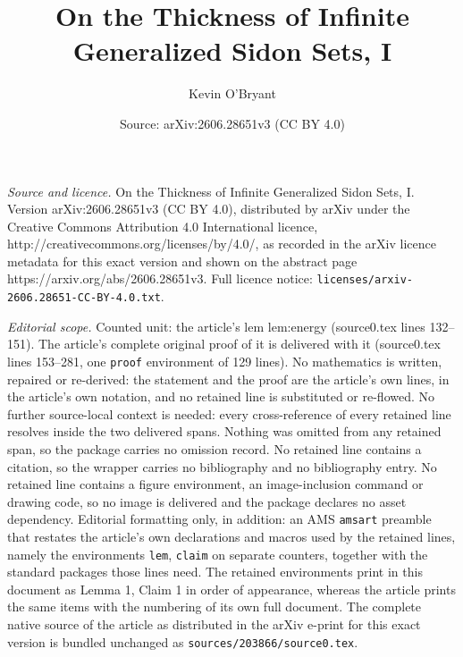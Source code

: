 \documentclass[10pt,a4paper]{amsart}
\title{On the Thickness of Infinite Generalized Sidon Sets, I}
\author{Kevin O'Bryant}
\date{Source: arXiv:2606.28651v3 (CC BY 4.0)}
\begin{document}
\maketitle

\noindent\emph{Source and licence.} On the Thickness of Infinite Generalized Sidon Sets, I. Version arXiv:2606.28651v3 (CC BY 4.0), distributed by arXiv under the Creative Commons Attribution 4.0 International licence, http://creativecommons.org/licenses/by/4.0/, as recorded in the arXiv licence metadata for this exact version and shown on the abstract page https://arxiv.org/abs/2606.28651v3. Full licence notice: \texttt{licenses/arxiv-2606.28651-CC-BY-4.0.txt}.\par\smallskip

\noindent\textit{Editorial scope.} Counted unit: the article's lem lem:energy (source0.tex lines 132--151). The article's complete original proof of it is delivered with it (source0.tex lines 153--281, one \texttt{proof} environment of 129 lines). No mathematics is written, repaired or re-derived: the statement and the proof are the article's own lines, in the article's own notation, and no retained line is substituted or re-flowed.  No further source-local context is needed: every cross-reference of every retained line resolves inside the two delivered spans.  Nothing was omitted from any retained span, so the package carries no omission record.  No retained line contains a citation, so the wrapper carries no bibliography and no bibliography entry.  No retained line contains a figure environment, an image-inclusion command or drawing code, so no image is delivered and the package declares no asset dependency.  Editorial formatting only, in addition: an AMS \texttt{amsart} preamble that restates the article's own declarations and macros used by the retained lines, namely the environments \texttt{lem}, \texttt{claim} on separate counters, together with the standard packages those lines need.  The retained environments print in this document as Lemma 1, Claim 1 in order of appearance, whereas the article prints the same items with the numbering of its own full document.  The complete native source of the article as distributed in the arXiv e-print for this exact version is bundled unchanged as \texttt{sources/203866/source0.tex}.
\end{document}
